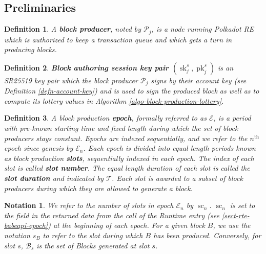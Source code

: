 \documentclass{book}
\newcommand{\tmop}[1]{\ensuremath{\operatorname{#1}}}
\newcommand{\tmstrong}[1]{\textbf{#1}}
\newcommand{\tmtextbf}[1]{{\bfseries{#1}}}
\newcommand{\tmtexttt}[1]{{\ttfamily{#1}}}
\newcommand{\tmverbatim}[1]{{\ttfamily{#1}}}
\newtheorem{definition}{Definition}
\newtheorem{notation}{Notation}
\providecommand{\tmop}[1]{\ensuremath{\mathrm{#1}}}
\providecommand{\tmstrong}[1]{\tmtextbf{#1}}
\providecommand{\tmtextbf}[1]{\tmtextbf{#1}}
\providecommand{\tmverbatim}[1]{\tmtexttt{#1}}
\newtheorem{definition}{Definition}
\newtheorem{notation}{Notation}
\begin{document}
\subsection{Preliminaries}

\begin{definition}
  A {\tmstrong{block producer}}, noted by $\mathcal{P}_j$, is a node running
  Polkadot RE which is authorized to keep a transaction queue and which gets a
  turn in producing blocks.
\end{definition}

\begin{definition}
  {\tmstrong{Block authoring session key pair $(\tmop{sk}^s_j,
  \tmop{pk}^s_j)$}} is an SR25519 key pair which the block producer
  $\mathcal{P}_j$ signs by their account key (see Definition
  \ref{defn-account-key}) and is used to sign the produced block as well as to
  compute its lottery values in Algorithm \ref{algo-block-production-lottery}.
  
\end{definition}

\begin{definition}
  \label{defn-epoch-slot}A block production {\tmstrong{epoch}}, formally
  referred to as $\mathcal{E}$, is a period with pre-known starting time and
  fixed length during which the set of block producers stays constant. Epochs
  are indexed sequentially, and we refer to the $n^{\tmop{th}}$ epoch since
  genesis by $\mathcal{E}_n$. Each epoch is divided into equal length periods
  known as block production {\tmstrong{slots}}, sequentially indexed in each
  epoch. The index of each slot is called {\tmstrong{slot number}}. The equal
  length duration of each slot is called the {\tmstrong{slot duration}} and
  indicated by $\mathcal{T}$. Each slot is awarded to a subset of block
  producers during which they are allowed to generate a block.
\end{definition}

\begin{notation}
  \label{note-slot}We refer to the number of slots in epoch $\mathcal{E}_n$ by
  $\tmop{sc}_n$. $\tmop{sc}_n$ is set to the \tmverbatim{duration} field in
  the returned data from the call of the Runtime entry
  \tmverbatim{BabeApi\_epoch} (see \ref{sect-rte-babeapi-epoch}) at the
  beginning of each epoch. For a given block $B$, we use the notation
  {\tmstrong{$s_B$}} to refer to the slot during which $B$ has been produced.
  Conversely, for slot $s$, $\mathcal{B}_s$ is the set of Blocks generated at
  slot $s$.
\end{notation}
\end{document}
